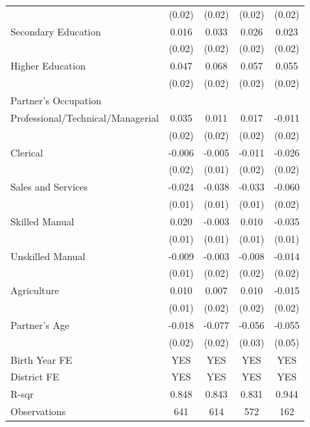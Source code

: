 \begin{longtable}{l*{4}{c}}
                    & (0.02) & (0.02) & (0.02) & (0.02) \\
\hspace{1em}Secondary Education & 0.016 & 0.033 & 0.026 & 0.023 \\
                    & (0.02) & (0.02) & (0.02) & (0.02) \\
\hspace{1em}Higher Education & 0.047\sym{*} & 0.068\sym{***} & 0.057\sym{**} & 0.055\sym{**} \\
                    & (0.02) & (0.02) & (0.02) & (0.02) \\
\multicolumn{5}{l}{Partner's Occupation} \\
\hspace{1em}Professional/Technical/Managerial & 0.035\sym{*} & 0.011 & 0.017 & -0.011 \\
                    & (0.02) & (0.02) & (0.02) & (0.02) \\
\hspace{1em}Clerical & -0.006 & -0.005 & -0.011 & -0.026 \\
                    & (0.02) & (0.01) & (0.02) & (0.02) \\
\hspace{1em}Sales and Services & -0.024\sym{*} & -0.038\sym{**} & -0.033\sym{***} & -0.060\sym{***} \\
                    & (0.01) & (0.01) & (0.01) & (0.02) \\
\hspace{1em}Skilled Manual & 0.020\sym{*} & -0.003 & 0.010 & -0.035\sym{***} \\
                    & (0.01) & (0.01) & (0.01) & (0.01) \\
\hspace{1em}Unskilled Manual & -0.009 & -0.003 & -0.008 & -0.014 \\
                    & (0.01) & (0.02) & (0.02) & (0.02) \\
\hspace{1em}Agriculture & 0.010 & 0.007 & 0.010 & -0.015 \\
                    & (0.01) & (0.02) & (0.02) & (0.02) \\
Partner's Age & -0.018 & -0.077\sym{***} & -0.056\sym{*} & -0.055 \\
                    & (0.02) & (0.02) & (0.03) & (0.05) \\
\hline
Birth Year FE & YES & YES & YES & YES \\
District FE & YES & YES & YES & YES \\
R-sqr & 0.848 & 0.843 & 0.831 & 0.944 \\
Observations & 641 & 614 & 572 & 162 \\
\hline \hline

\end{longtable}